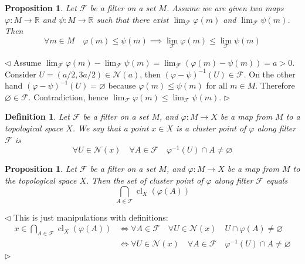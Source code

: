 \documentclass[12pt]{article}
\newtheorem{proposition}[theorem]{Proposition}
\newtheorem{definition}[theorem]{Definition}
\newenvironment{proof}{\par $\triangleleft$}{$\triangleright$}
\begin{document}
\begin{proposition} Let $\mathcal{F}$ be a filter on a set $M$. Assume we are
    given two maps $\varphi:M\to\mathbb{R}$ and $\psi:M\to\mathbb{R}$ such that
    there exist $\lim_{\mathcal{F}}\varphi(m)$ and $\lim_{\mathcal{F}}\psi(m)$.
    Then
    $$
        \forall m\in M\quad\varphi(m)\leq\psi(m) \implies
        \lim_{\mathcal{F}}\varphi(m)\leq\lim_{\mathcal{F}}\psi(m)
    $$
\end{proposition}
\begin{proof} Assume $\lim_{\mathcal{F}}\varphi(m)-\lim_{\mathcal{F}}\psi(m)=
        \lim_{\mathcal{F}}(\varphi(m)-\psi(m))=a>0$. Consider
    $U=(a/2,3a/2)\in\mathcal{N}(a)$, then
    ${(\varphi-\psi)}^{-1}(U)\in\mathcal{F}$. On the other hand
    ${(\varphi-\psi)}^{-1}(U)=\varnothing$ because $\varphi(m)\leq\psi(m)$
    for all $m\in M$. Therefore $\varnothing\in\mathcal{F}$. Contradiction,
    hence $\lim_{\mathcal{F}}\varphi(m)\leq\lim_{\mathcal{F}}\psi(m)$.
\end{proof}

\begin{definition}\label{DefClusterPointAlongTheFilter} Let $\mathcal{F}$ be a
    filter on  a set $M$, and $\varphi:M\to X$ be a map from $M$ to a
    topological space $X$. We say that a point $x\in X$ is a cluster point of
    $\varphi$ along filter $\mathcal{F}$ is
    $$
        \forall U\in\mathcal{N}(x)\quad \forall A\in\mathcal{F} \quad \varphi^{-1}(U)\cap A\neq\varnothing
    $$
\end{definition}

\begin{proposition}\label{PrClusterPointAlongTheFilterCharac} Let $\mathcal{F}$
    be a filter on  a set $M$, and $\varphi:M\to X$ be a map from $M$ to the
    topological space $X$. Then the set of cluster point of $\varphi$ along
    filter $\mathcal{F}$ equals
    $$
        \bigcap_{A\in\mathcal{F}} \operatorname{cl}_X(\varphi(A))
    $$
\end{proposition}
\begin{proof} This is just manipulations with definitions:
    $$
        \begin{aligned}
            x\in \bigcap_{A\in\mathcal{F}} \operatorname{cl}_X(\varphi(A))
             & \Longleftrightarrow
            \forall A\in\mathcal{F} \quad \forall U\in\mathcal{N}(x) \quad U\cap \varphi(A)\neq\varnothing     \\
             & \Longleftrightarrow
            \forall U\in\mathcal{N}(x)\quad \forall A\in\mathcal{F} \quad \varphi^{-1}(U)\cap A\neq\varnothing \\
        \end{aligned}
    $$
\end{proof}
\end{document}
